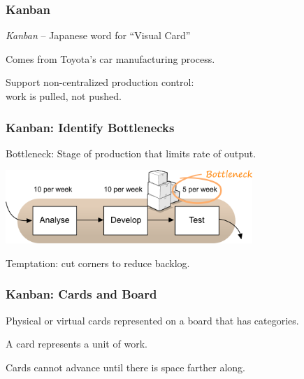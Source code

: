 \begin{frame}
\frametitle{Kanban}

\begin{changemargin}{1cm}
\textit{Kanban} -- Japanese word for ``Visual Card''

Comes from Toyota's car manufacturing process.

Support non-centralized production control: \\
	\quad work is pulled, not pushed.
\end{changemargin}
\end{frame}


\begin{frame}
\frametitle{Kanban: Identify Bottlenecks}

\begin{changemargin}{1cm}
\alert{Bottleneck}: Stage of production that limits rate of output.
\begin{center}
	\includegraphics[width=0.7\textwidth]{images/bottleneck-inventory.png}
\end{center}

Temptation: cut corners to reduce backlog.

\end{changemargin}
\end{frame}

\begin{frame}
\frametitle{Kanban: Cards and Board}
\begin{changemargin}{1cm}

Physical or virtual cards represented on a board that has categories.

A card represents a unit of work.

Cards cannot advance until there is space farther along.

\end{changemargin}
\end{frame}



